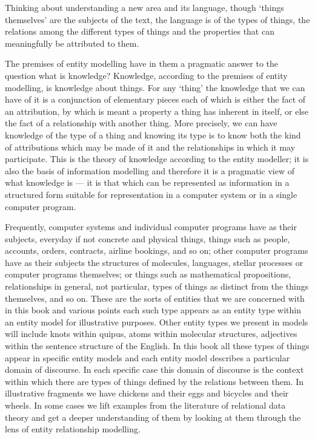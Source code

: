 Thinking about understanding a new area and its language, though ‘things themselves’ are the subjects of the text, the language is of the types of things, the relations among the different types of things and the properties that can meaningfully be attributed to them. 

The premises of entity modelling have in them a pragmatic answer to the question what is knowledge? Knowledge, according to the premises of entity modelling, is knowledge about things. For any ‘thing’ the knowledge that we can have of it is a conjunction of elementary pieces each of which is either the fact of an attribution, by which is meant a property a thing has inherent in itself, or else the fact of a relationship with another thing. More precisely, we can have knowledge of the type of a thing and knowing its type is to know both the kind of attributions which may be made of it and the relationships in which it may participate. This is the theory of knowledge according to the entity modeller; it is also the basis of information modelling and therefore it is a pragmatic view of what knowledge is — it is that which can be represented as information in a structured form suitable for representation in a computer system or in a single computer program.

Frequently, computer systems and individual computer programs have as their subjects, everyday if not concrete and physical things, things such as people, accounts, orders, contracts, airline bookings, and so on; other computer programs have as their subjects the structures of molecules, languages, stellar processes or computer programs themselves; or things such as mathematical propositions, relationships in general, not particular, types of things as distinct from the things themselves, and so on. 
These are the sorts of entities that we are concerned with in this book and various points each such type appears as an entity type within an entity model for illustrative purposes. Other entity types we present in models will include knots within quipus, atoms within molecular structures, adjectives within the sentence structure of the English. 
In this book all these types of things appear in specific entity models and each entity model describes a particular domain of discourse. 
In each specific case this domain of discourse is the context within which there are types of things defined by the relations between them. 
In illustrative fragments we have chickens and their eggs and bicycles and their wheels. 
In some cases we lift examples from the literature of relational data theory and get a deeper understanding of them by looking at them through the lens of entity relationship modelling.



